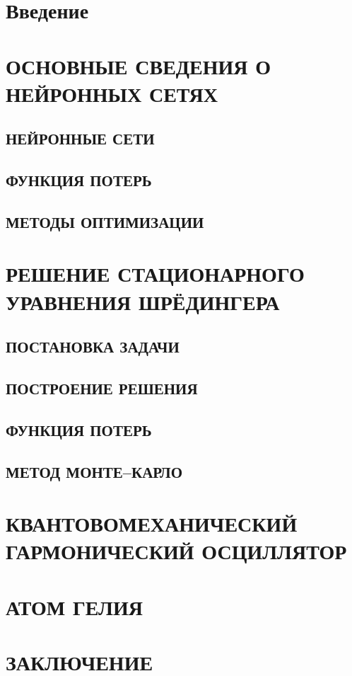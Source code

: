 \documentclass[12pt, russian, a4paper]{article}
\begin{document}
    
    \setcounter{page}{1}

    \tableofcontents
    
    \newpage
    \section*{Введение}
    

    \newpage
    \section{ОСНОВНЫЕ СВЕДЕНИЯ О НЕЙРОННЫХ СЕТЯХ}
    \subsection{НЕЙРОННЫЕ СЕТИ}
    \subsection{ФУНКЦИЯ ПОТЕРЬ}
    \subsection{МЕТОДЫ ОПТИМИЗАЦИИ}

    \newpage
    \section{РЕШЕНИЕ СТАЦИОНАРНОГО УРАВНЕНИЯ ШРЁДИНГЕРА}
    \subsection{ПОСТАНОВКА ЗАДАЧИ}

    
    \subsection{ПОСТРОЕНИЕ РЕШЕНИЯ}
    
    \subsection{ФУНКЦИЯ ПОТЕРЬ}
    \subsection{МЕТОД МОНТЕ--КАРЛО}

    \newpage
    \section{КВАНТОВОМЕХАНИЧЕСКИЙ ГАРМОНИЧЕСКИЙ ОСЦИЛЛЯТОР}

    \newpage
    \section{АТОМ ГЕЛИЯ}
        
    \newpage
    \section*{ЗАКЛЮЧЕНИЕ}

    \newpage
    
    
\end{document}
